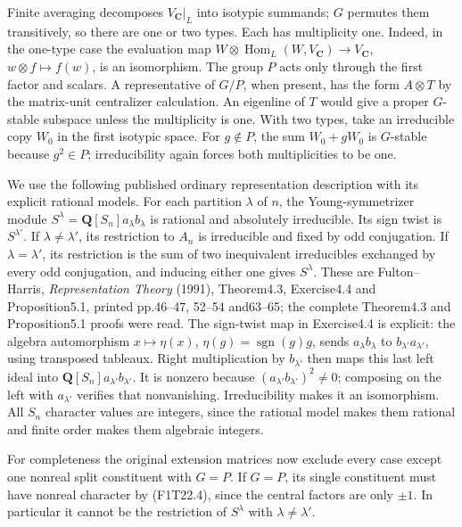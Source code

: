 Finite averaging decomposes \(V_{\mathbf C}|_L\)
into isotypic summands; \(G\) permutes them transitively,
so there are one or two types. Each has multiplicity one.
Indeed, in the one-type case the evaluation map
\(W\otimes\operatorname{Hom}_L(W,V_{\mathbf C})
\to V_{\mathbf C}\), \(w\otimes f\mapsto f(w)\),
is an isomorphism. The group \(P\) acts only through
the first factor and scalars. A representative of
\(G/P\), when present, has the form \(A\otimes T\)
by the matrix-unit centralizer calculation. An eigenline
of \(T\) would give a proper \(G\)-stable subspace
unless the multiplicity is one. With two types, take an
irreducible copy \(W_0\) in the first isotypic space.
For \(g\notin P\), the sum \(W_0+gW_0\) is
\(G\)-stable because \(g^2\in P\); irreducibility
again forces both multiplicities to be one.

We use the following published ordinary representation
description with its explicit rational models. For each
partition \(\lambda\) of \(n\), the Young-symmetrizer
module \(S^\lambda=\mathbf Q[S_n]a_\lambda b_\lambda\)
is rational and absolutely irreducible. Its sign twist is
\(S^{\lambda'}\). If \(\lambda\ne\lambda'\),
its restriction to \(A_n\) is irreducible and fixed by
odd conjugation. If \(\lambda=\lambda'\), its
restriction is the sum of two inequivalent irreducibles
exchanged by every odd conjugation, and inducing either
one gives \(S^\lambda\). These are Fulton--Harris,
\emph{Representation Theory} (1991), Theorem4.3,
Exercise4.4 and Proposition5.1, printed pp.46--47,
52--54 and63--65; the complete Theorem4.3 and
Proposition5.1 proofs were read. The sign-twist map in
Exercise4.4 is explicit: the algebra automorphism
\(x\mapsto\eta(x)\), \(\eta(g)=\operatorname{sgn}(g)g\),
sends \(a_\lambda b_\lambda\) to
\(b_{\lambda'}a_{\lambda'}\), using transposed
tableaux. Right multiplication by \(b_{\lambda'}\)
then maps this last left ideal into
\(\mathbf Q[S_n]a_{\lambda'}b_{\lambda'}\).
It is nonzero because
\((a_{\lambda'}b_{\lambda'})^2\ne0\); composing
on the left with \(a_{\lambda'}\) verifies that
nonvanishing. Irreducibility makes it an isomorphism.
All \(S_n\) character values are integers, since
the rational model makes them rational and finite order
makes them algebraic integers.

For completeness the original extension matrices now
exclude every case except one nonreal split constituent
with \(G=P\). If \(G=P\), its single constituent
must have nonreal character by (F1T22.4), since the
central factors are only \(\pm1\). In particular it
cannot be the restriction of \(S^\lambda\) with
\(\lambda\ne\lambda'\).


